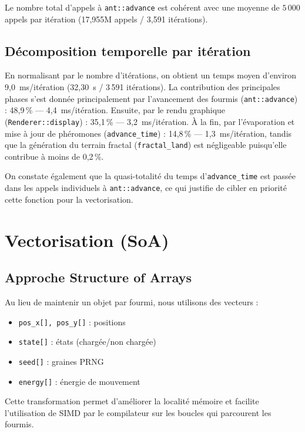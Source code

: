 \documentclass[12pt,a4paper]{article}
\begin{document}
Le nombre total d'appels à \texttt{ant::advance} est cohérent avec une moyenne de $5\,000$ appels par itération (17,955M appels / 3,591 itérations). 

\subsection{Décomposition temporelle par itération}

En normalisant par le nombre d'itérations, on obtient un temps moyen d'environ 9,0~ms/itération (32,30~s / 3\,591 itérations). La contribution des principales phases s'est donnée principalement par l'avancement des fourmis (\texttt{ant::advance}) : 48,9\,\% --- 4,4~ms/itération. Ensuite, par le rendu graphique (\texttt{Renderer::display}) : 35,1\,\% --- 3,2~ms/itération. À la fin, par l'évaporation et mise à jour de phéromones (\texttt{advance\_time}) : 14,8\,\% --- 1,3~ms/itération, tandis que la génération du terrain fractal (\texttt{fractal\_land}) est négligeable puisqu'elle contribue à moins de 0,2\,\%. 

On constate également que la quasi-totalité du temps d'\texttt{advance\_time} est passée dans les appels individuels à \texttt{ant::advance}, ce qui justifie de cibler en priorité cette fonction pour la vectorisation.

\section{Vectorisation (SoA)}
\label{sec:vectorization}

\subsection{Approche Structure of Arrays}

Au lieu de maintenir un objet par fourmi, nous utilisons des vecteurs :
\begin{itemize}
    \item \texttt{pos\_x[], pos\_y[]} : positions
    \item \texttt{state[]} : états (chargée/non chargée)
    \item \texttt{seed[]} : graines PRNG
    \item \texttt{energy[]} : énergie de mouvement
\end{itemize}
Cette transformation permet d'améliorer la localité mémoire et facilite l'utilisation de SIMD par le compilateur sur les boucles qui parcourent les fourmis. 
\end{document}
